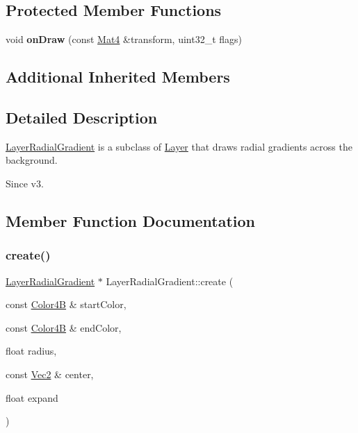 \subsection*{Protected Member Functions}
\begin{DoxyCompactItemize}
\item 
\mbox{\label{classLayerRadialGradient_a16bbe0a7005e0727a35c96c6ac59b065}} 
void {\bfseries on\+Draw} (const \hyperlink{classMat4}{Mat4} \&transform, uint32\+\_\+t flags)
\end{DoxyCompactItemize}
\subsection*{Additional Inherited Members}


\subsection{Detailed Description}
\hyperlink{classLayerRadialGradient}{Layer\+Radial\+Gradient} is a subclass of \hyperlink{classLayer}{Layer} that draws radial gradients across the background. 

\begin{DoxySince}{Since}
v3. 
\end{DoxySince}


\subsection{Member Function Documentation}
\mbox{\label{classLayerRadialGradient_a99fc7fcdd9828907ed9873c576d2f790}} 
\subsubsection{\texorpdfstring{create()}{create()}}
{\footnotesize\ttfamily \hyperlink{classLayerRadialGradient}{Layer\+Radial\+Gradient} $\ast$ Layer\+Radial\+Gradient\+::create (\begin{DoxyParamCaption}\item[{const \hyperlink{structColor4B}{Color4B} \&}]{start\+Color,  }\item[{const \hyperlink{structColor4B}{Color4B} \&}]{end\+Color,  }\item[{float}]{radius,  }\item[{const \hyperlink{classVec2}{Vec2} \&}]{center,  }\item[{float}]{expand }\end{DoxyParamCaption})\hspace{0.3cm}{\ttfamily [static]}}

